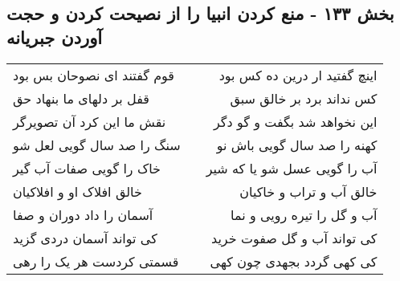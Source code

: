\begin{center}
\section*{بخش ۱۳۳ - منع کردن انبیا را از نصیحت کردن و  حجت آوردن جبریانه}
\label{sec:sh133}
\begin{longtable}{l p{0.5cm} r}
قوم گفتند ای نصوحان بس بود
&&
اینچ گفتید ار درین ده کس بود
\\
قفل بر دلهای ما بنهاد حق
&&
کس نداند برد بر خالق سبق
\\
نقش ما این کرد آن تصویرگر
&&
این نخواهد شد بگفت و گو دگر
\\
سنگ را صد سال گویی لعل شو
&&
کهنه را صد سال گویی باش نو
\\
خاک را گویی صفات آب گیر
&&
آب را گویی عسل شو یا که شیر
\\
خالق افلاک او و افلاکیان
&&
خالق آب و تراب و خاکیان
\\
آسمان را داد دوران و صفا
&&
آب و گل را تیره رویی و نما
\\
کی تواند آسمان دردی گزید
&&
کی تواند آب و گل صفوت خرید
\\
قسمتی کردست هر یک را رهی
&&
کی کهی گردد بجهدی چون کهی
\\
\end{longtable}
\end{center}
